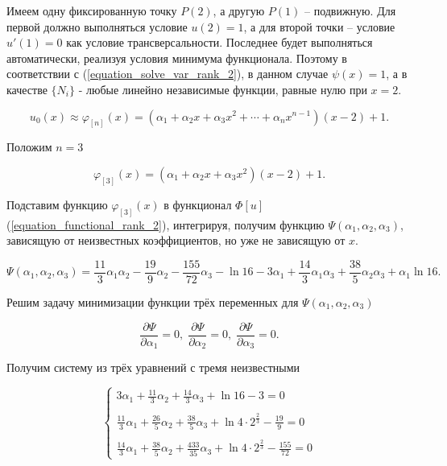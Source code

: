 \documentclass{article}
\begin{document}
Имеем одну фиксированную точку $P(2)$, а другую $P(1)$ – подвижную. Для первой должно выполняться условие $u(2)=1$, а для второй точки – условие $u'(1)=0$ как условие трансверсальности. Последнее будет выполняться автоматически, реализуя условия минимума функционала. Поэтому в соответствии с (\ref{equation_solve_var_rank_2}), в данном случае $\psi(x) = 1$, а в качестве $\lbrace N_{i} \rbrace$ - любые линейно независимые функции, равные нулю при $x=2$.

\begin{displaymath}
	u_{0}(x) \approx \varphi_{[n]}(x) = (\alpha_{1} + \alpha_{2}x + \alpha_{3}x^2 + \cdots + \alpha_{n}x^{n-1})(x-2)+1.
\end{displaymath}

\noindent Положим $n = 3$

\begin{displaymath}
	\varphi_{[3]}(x) = (\alpha_{1} + \alpha_{2}x + \alpha_{3}x^2)(x-2)+1.
\end{displaymath}

\noindent Подставим функцию $\varphi_{[3]}(x)$ в функционал $\Phi[u]$ (\ref{equation_functional_rank_2}), интегрируя, получим функцию $\Psi(\alpha_{1}, \alpha_{2}, \alpha_{3})$, зависящую от неизвестных коэффициентов, но уже не зависящую от $x$.

\begin{displaymath}
	\Psi(\alpha_{1}, \alpha_{2}, \alpha_{3}) = \frac{11}{3}\alpha_{1}\alpha_{2} - \frac{19}{9}\alpha_{2} - \frac{155}{72}\alpha_{3} - \ln{16} - 3\alpha_{1} + \frac{14}{3}\alpha_{1}\alpha_{3} + \frac{38}{5}\alpha_{2}\alpha_{3} + \alpha_{1}\ln{16}.
\end{displaymath}

Решим задачу минимизации функции трёх переменных для $\Psi(\alpha_{1}, \alpha_{2}, \alpha_{3})$

\begin{displaymath}
	\frac{\partial \Psi}{\partial \alpha_{1}} = 0, \;
	\frac{\partial \Psi}{\partial \alpha_{2}} = 0, \;
	\frac{\partial \Psi}{\partial \alpha_{3}} = 0.
\end{displaymath}

\noindent Получим систему из трёх уравнений с тремя неизвестными

\begin{displaymath}
	\begin{cases}
		3\alpha_{1} + \frac{11}{3}\alpha_{2} + \frac{14}{3}\alpha_{3} + \ln{16} - 3 = 0 \\
		\\
		\frac{11}{3}\alpha_{1} + \frac{26}{5}\alpha_{2} + \frac{38}{5}\alpha_{3} + \ln{4 \cdot 2^{\frac{2}{3}}} - \frac{19}{9} = 0 \\
		\\
		\frac{14}{3}\alpha_{1} + \frac{38}{5}\alpha_{2} + \frac{433}{35}\alpha_{3} + \ln{4 \cdot 2^{\frac{2}{3}}} - \frac{155}{72} = 0
	\end{cases}
\end{displaymath}
\end{document}
